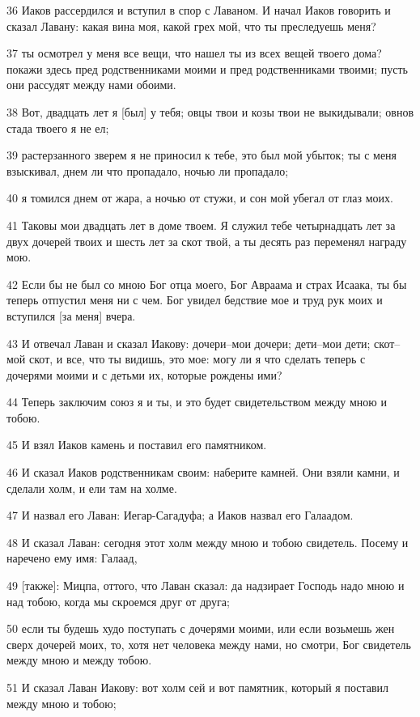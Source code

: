 \par 36 Иаков рассердился и вступил в спор с Лаваном. И начал Иаков говорить и сказал Лавану: какая вина моя, какой грех мой, что ты преследуешь меня?
\par 37 ты осмотрел у меня все вещи, что нашел ты из всех вещей твоего дома? покажи здесь пред родственниками моими и пред родственниками твоими; пусть они рассудят между нами обоими.
\par 38 Вот, двадцать лет я [был] у тебя; овцы твои и козы твои не выкидывали; овнов стада твоего я не ел;
\par 39 растерзанного зверем я не приносил к тебе, это был мой убыток; ты с меня взыскивал, днем ли что пропадало, ночью ли пропадало;
\par 40 я томился днем от жара, а ночью от стужи, и сон мой убегал от глаз моих.
\par 41 Таковы мои двадцать лет в доме твоем. Я служил тебе четырнадцать лет за двух дочерей твоих и шесть лет за скот твой, а ты десять раз переменял награду мою.
\par 42 Если бы не был со мною Бог отца моего, Бог Авраама и страх Исаака, ты бы теперь отпустил меня ни с чем. Бог увидел бедствие мое и труд рук моих и вступился [за меня] вчера.
\par 43 И отвечал Лаван и сказал Иакову: дочери--мои дочери; дети--мои дети; скот--мой скот, и все, что ты видишь, это мое: могу ли я что сделать теперь с дочерями моими и с детьми их, которые рождены ими?
\par 44 Теперь заключим союз я и ты, и это будет свидетельством между мною и тобою.
\par 45 И взял Иаков камень и поставил его памятником.
\par 46 И сказал Иаков родственникам своим: наберите камней. Они взяли камни, и сделали холм, и ели там на холме.
\par 47 И назвал его Лаван: Иегар-Сагадуфа; а Иаков назвал его Галаадом.
\par 48 И сказал Лаван: сегодня этот холм между мною и тобою свидетель. Посему и наречено ему имя: Галаад,
\par 49 [также]: Мицпа, оттого, что Лаван сказал: да надзирает Господь надо мною и над тобою, когда мы скроемся друг от друга;
\par 50 если ты будешь худо поступать с дочерями моими, или если возьмешь жен сверх дочерей моих, то, хотя нет человека между нами, но смотри, Бог свидетель между мною и между тобою.
\par 51 И сказал Лаван Иакову: вот холм сей и вот памятник, который я поставил между мною и тобою;
